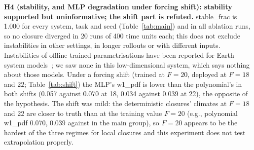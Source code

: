\textbf{H4 (stability, and MLP degradation under forcing shift): stability supported but uninformative; the shift part is refuted.} stable\_frac is 1.000 for every system, task and seed (Table~\ref{tab:main}) and in all ablation runs, so no closure diverged in 20 runs of 400 time units each; this does not exclude instabilities in other settings, in longer rollouts or with different inputs. Instabilities of offline-trained parametrisations have been reported for Earth system models~\cite{rasp2019coupled}; we saw none in this low-dimensional system, which says nothing about those models. Under a forcing shift (trained at $F{=}20$, deployed at $F{=}18$ and $22$; Table~\ref{tab:shift}) the MLP's w1\_pdf is lower than the polynomial's in both shifts (0.057 against 0.070 at 18, 0.034 against 0.039 at 22), the opposite of the hypothesis. The shift was mild: the deterministic closures' climates at $F{=}18$ and 22 are closer to truth than at the training value $F{=}20$ (e.g., polynomial w1\_pdf 0.070, 0.039 against  in the main group), so $F{=}20$ appears to be the hardest of the three regimes for local closures and this experiment does not test extrapolation properly.

